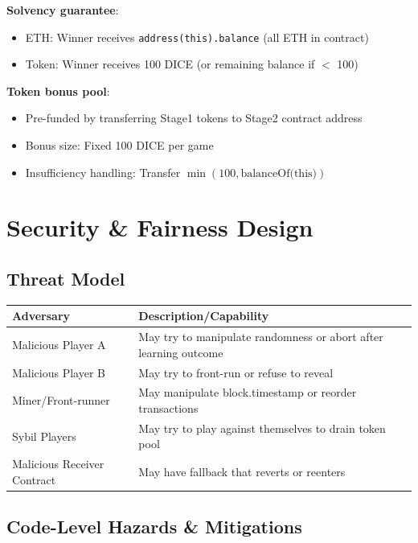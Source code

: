 \documentclass[10pt,a4paper]{article}
\begin{document}
\textbf{Solvency guarantee}:
\begin{itemize}
    \item ETH: Winner receives \texttt{address(this).balance} (all ETH in contract)
    \item Token: Winner receives 100 DICE (or remaining balance if $<$ 100)
\end{itemize}

\textbf{Token bonus pool}:
\begin{itemize}
    \item Pre-funded by transferring Stage1 tokens to Stage2 contract address
    \item Bonus size: Fixed 100 DICE per game
    \item Insufficiency handling: Transfer $\min(100, \text{balanceOf(this)})$
\end{itemize}

\section{Security \& Fairness Design}

\subsection*{Threat Model}

\begin{table}[h]
\centering
\begin{tabularx}{\textwidth}{l X}
\toprule
\textbf{Adversary} & \textbf{Description/Capability} \\
\midrule
Malicious Player A & May try to manipulate randomness or abort after learning outcome \\
Malicious Player B & May try to front-run or refuse to reveal \\
Miner/Front-runner & May manipulate block.timestamp or reorder transactions \\
Sybil Players & May try to play against themselves to drain token pool \\
Malicious Receiver Contract & May have fallback that reverts or reenters \\
\bottomrule
\end{tabularx}
\end{table}

\subsection*{Code-Level Hazards \& Mitigations}
\end{document}
